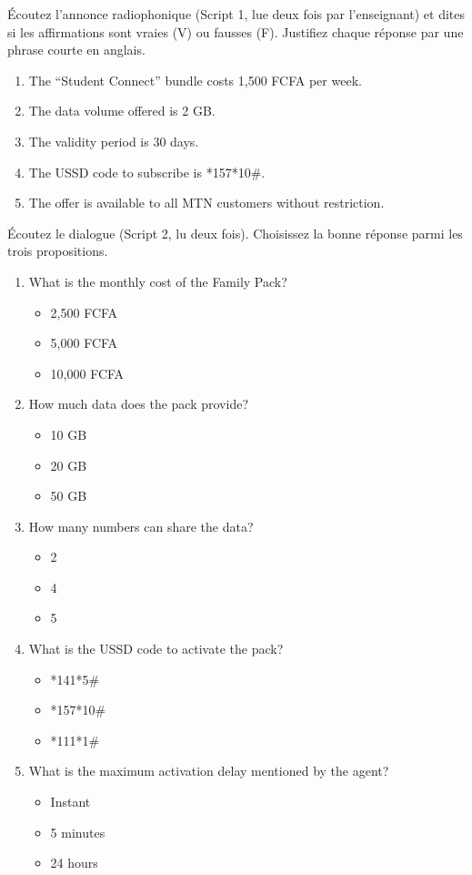 \documentclass[11pt]{article}
\begin{document}
\begin{exercice}
Écoutez l'annonce radiophonique (Script 1, lue deux fois par l'enseignant) et dites si les affirmations sont vraies (V) ou fausses (F). Justifiez chaque réponse par une phrase courte en anglais.
\begin{enumerate}
\item The “Student Connect” bundle costs 1,500 FCFA per week.
\item The data volume offered is 2 GB.
\item The validity period is 30 days.
\item The USSD code to subscribe is *157*10\#.
\item The offer is available to all MTN customers without restriction.
\end{enumerate}
\end{exercice}

\begin{exercice}
Écoutez le dialogue (Script 2, lu deux fois). Choisissez la bonne réponse parmi les trois propositions.
\begin{enumerate}
\item What is the monthly cost of the Family Pack?
      \begin{itemize}
      \item[a)] 2,500 FCFA
      \item[b)] 5,000 FCFA
      \item[c)] 10,000 FCFA
      \end{itemize}
\item How much data does the pack provide?
      \begin{itemize}
      \item[a)] 10 GB
      \item[b)] 20 GB
      \item[c)] 50 GB
      \end{itemize}
\item How many numbers can share the data?
      \begin{itemize}
      \item[a)] 2
      \item[b)] 4
      \item[c)] 5
      \end{itemize}
\item What is the USSD code to activate the pack?
      \begin{itemize}
      \item[a)] *141*5\#
      \item[b)] *157*10\#
      \item[c)] *111*1\#
      \end{itemize}
\item What is the maximum activation delay mentioned by the agent?
      \begin{itemize}
      \item[a)] Instant
      \item[b)] 5 minutes
      \item[c)] 24 hours
      \end{itemize}
\end{enumerate}
\end{exercice}
\end{document}
